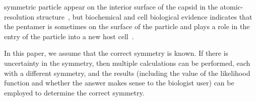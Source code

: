 symmetric particle appear on the interior surface of the capsid in the
atomic-resolution
structure~\cite{FisherJohnson.FHV.crystalstructure.Nature.1993,Cheng...BakerJohnson.FHV.crystallographyandcryoEM.Structure.1994},
but biochemical and cell biological evidence indicates that the pentamer is
sometimes on the surface of the particle and plays a role in the entry of
the particle into a new host
cell~\cite{Odegard...Johnson.FHV.gamma.CurrentTopicsMicrobiolImmun.2010,Walukiewicz...Johnson.FHV.gamma.JVirology.2008}.
\par
In this paper, we assume that the correct symmetry is known.
If there is uncertainty in the symmetry, then multiple calculations can be
performed, each with a different symmetry, and the results (including the
value of the likelihood function and whether the answer makes sense to the
biologist user) can be employed to determine the correct symmetry.
